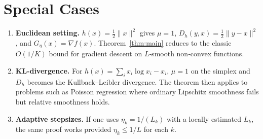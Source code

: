 \documentclass{article}
\newcommand{\grad}{\nabla}
\newcommand{\Breg}{D_{h}}
\begin{document}
\section*{Special Cases}
\begin{enumerate}
\item \textbf{Euclidean setting.} $h(x)=\tfrac12\|x\|^{2}$ gives $\mu=1$, $\Breg (y,x)=\tfrac12\|y-x\|^{2}$, and $G_{\eta}(x)=\grad f(x)$. Theorem~\ref{thm:main} reduces to the classic $O(1/K)$ bound for gradient descent on $L$‑smooth non‑convex functions.
\item \textbf{KL‑divergence.} For $h(x)=\sum_{i}x_i\log x_i -x_i$, $\mu=1$ on the simplex and $\Breg$ becomes the Kullback–Leibler divergence. The theorem then applies to problems such as Poisson regression where ordinary Lipschitz smoothness fails but relative smoothness holds.
\item \textbf{Adaptive stepsizes.} If one uses $\eta_k=1/(L_k)$ with a locally estimated $L_k$, the same proof works provided $\eta_k\le1/L$ for each $k$.
\end{enumerate}
\end{document}
